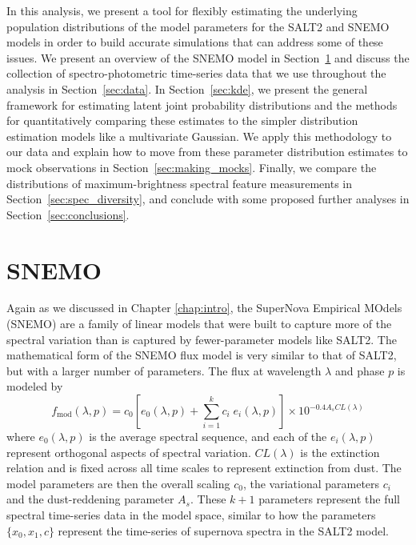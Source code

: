 In this analysis, we present a tool for flexibly estimating the underlying population distributions of the model parameters for the SALT2 and SNEMO models in order to build accurate simulations that can address some of these issues. We present an overview of the SNEMO model in Section~\ref{sec:snemo} and discuss the collection of spectro-photometric time-series data that we use throughout the analysis in Section~\ref{sec:data}. In Section~\ref{sec:kde}, we present the general framework for estimating latent joint probability distributions and the methods for quantitatively comparing these estimates to the simpler distribution estimation models like a multivariate Gaussian. We apply this methodology to our data and explain how to move from these parameter distribution estimates to mock observations in Section~\ref{sec:making_mocks}. Finally, we compare the distributions of maximum-brightness spectral feature measurements in Section~\ref{sec:spec_diversity}, and conclude with some proposed further analyses in Section~\ref{sec:conclusions}.

\section{SNEMO}
\label{sec:snemo}
Again as we discussed in Chapter \ref{chap:intro}, the SuperNova Empirical MOdels (SNEMO) are a family of linear models that were built to capture more of the spectral variation than is captured by fewer-parameter models like SALT2. The mathematical form of the SNEMO flux model is very similar to that of SALT2, but with a larger number of parameters. The flux at wavelength $\lambda$ and phase $p$ is modeled by
\begin{equation}
    f_\text{mod}(\lambda, p) = c_0 \left[e_0(\lambda, p) + \displaystyle\sum_{i=1}^k c_i\;e_i(\lambda, p)\right] \times 10^{-0.4 A_s CL(\lambda)}
\label{eqn:snemo_flux_model}
\end{equation}
where $e_0(\lambda, p)$ is the average spectral sequence, and each of the $e_i(\lambda, p)$ represent orthogonal aspects of spectral variation. $CL(\lambda)$ is the \cite{fitzpatrick_correcting_1999} extinction relation and is fixed across all time scales to represent extinction from dust. The model parameters are then the overall scaling $c_0$, the variational parameters $c_i$ and the dust-reddening parameter $A_s$. These $k+1$ parameters represent the full spectral time-series data in the model space, similar to how the parameters $\{x_0, x_1, c\}$ represent the time-series of supernova spectra in the SALT2 model.

